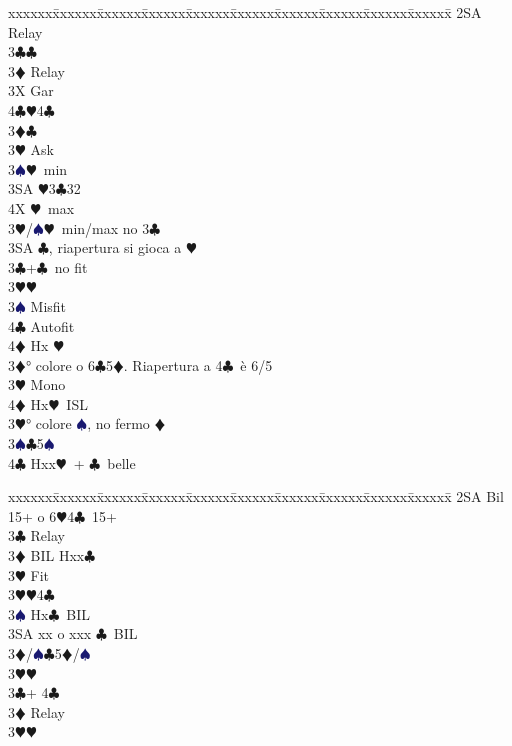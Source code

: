 \documentclass[a4paper,italian]{article}
\newcommand{\BC}{\textcolor{OliveGreen}{$\clubsuit$}}
\newcommand{\BD}{\textcolor{RedOrange}{$\vardiamondsuit$}}
\newcommand{\BH}{\textcolor{Red2}{$\varheartsuit${}}}
\newcommand{\BS}{\textcolor{MidnightBlue}{$\spadesuit${}}}
\newenvironment{bidtable}
{\begin{tabbing}

    xxxxxx\=xxxxxx\=xxxxxx\=xxxxxx\=xxxxxx\=xxxxxx\=xxxxxx\=xxxxxx\=xxxxxx\=xxxxxx\=\kill}
{\end{tabbing} }%
\begin{document}
\begin{multicols}{2}
\begin{bidtable}
        2SA \> Relay\+\\
        3\BC {}\BC \+\\
        3\BD \> Relay\+\\
        3X \> Gar\\
        4\BC {}\BH 4\BC \-\-\\
        3\BD {}\BC \+\\
        3\BH \> Ask\+\\
        3\BS {}\BH\ min\\
        3SA \BH 3\BC 32\\
        4X \BH\ max\-\-\\
        3\BH/\BS {}\BH\ min/max no 3\BC \\
        3SA \BC , riapertura si gioca a \BH \-\\
        3\BC {}+\BC\ no fit\+\\
        3\BH {}\BH \+\\
        3\BS \> Misfit\\
        4\BC \> Autofit\\
        4\BD \> Hx \BH \-\-\\
        3\BD {}° colore o 6\BC 5\BD . Riapertura a 4\BC\ è 6/5\+\\
        3\BH \> Mono\+\\
        4\BD \> Hx\BH\ ISL\-\-\\
        3\BH {}° colore \BS, no fermo \BD\\
        3\BS {}\BC 5\BS \\
        4\BC \> Hxx\BH\ + \BC\ belle\-\\
    \end{bidtable}
    \columnbreak
    \begin{bidtable}
        2SA \> Bil 15+ o 6\BH 4\BC\ 15+\+\\
        3\BC \> Relay\+\\
        3\BD \> BIL Hxx\BC \+\\
        3\BH \> Fit\-\\
        3\BH {}\BH 4\BC \\
        3\BS \> Hx\BC\ BIL\\
        3SA \> xx o xxx \BC\ BIL\-\\
        3\BD/\BS {}\BC 5\BD /\BS \\
        3\BH {}\BH \-\\
        3\BC {}+ 4\BC \+\\
        3\BD \> Relay\\
        3\BH {}\BH \\

\end{bidtable}
\end{multicols}
\end{document}
